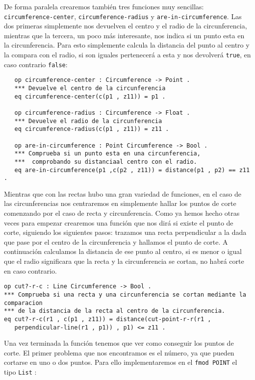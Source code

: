 De forma paralela crearemos también tres funciones muy sencillas: \texttt{circumference-center}, \texttt{circumference-radius} y \texttt{are-in-circumference}. Las dos primeras simplemente nos devuelven el centro y el radio de la circunferencia, mientras que la tercera, un poco más interesante, nos indica si un punto esta en la circunferencia. Para esto simplemente calcula la distancia del punto al centro y la compara con el radio, si son iguales pertenecerá a esta y nos devolverá \texttt{true}, en caso contrario \texttt{false}: \par
{\codesize
\begin{verbatim}		
   op circumference-center : Circumference -> Point .
   *** Devuelve el centro de la circunferencia
   eq circumference-center(c(p1 , z11)) = p1 .

   op circumference-radius : Circumference -> Float .
   *** Devuelve el radio de la circunferencia
   eq circumference-radius(c(p1 , z11)) = z11 .

   op are-in-circumference : Point Circumference -> Bool .
   *** Comprueba si un punto esta en una circunferencia, 
   ***  comprobando su distanciaal centro con el radio.
   eq are-in-circumference(p1 ,c(p2 , z11)) = distance(p1 , p2) == z11 .
\end{verbatim}  
}

Mientras que con las rectas hubo una gran variedad de funciones, en el caso de las circunferencias nos centraremos en simplemente hallar los puntos de corte comenzando por el caso de recta y circunferencia. Como ya hemos hecho otras veces para empezar crearemos una función que nos dirá si existe el punto de corte, siguiendo los siguientes pasos: trazamos una recta perpendicular a la dada que pase por el centro de la circunferencia y hallamos el punto de corte. A continuación calculamos la distancia de ese punto al centro, si es menor o igual que el radio significara que la recta y la circunferencia se cortan, no habrá corte en caso contrario.\par

{\codesize
\begin{verbatim}
op cut?-r-c : Line Circumference -> Bool .
*** Comprueba si una recta y una circunferencia se cortan mediante la comparacion 
*** de la distancia de la recta al centro de la circunferencia.
eq cut?-r-c(r1 , c(p1 , z11)) = distance(cut-point-r-r(r1 , 
   perpendicular-line(r1 , p1)) , p1) <= z11 .
\end{verbatim}
}

Una vez terminada la función tenemos que ver como conseguir los puntos de corte. El primer problema que nos encontramos es el número, ya que pueden cortarse en uno o dos puntos. Para ello implementaremos en el \texttt{fmod POINT} el tipo \texttt{List} :

